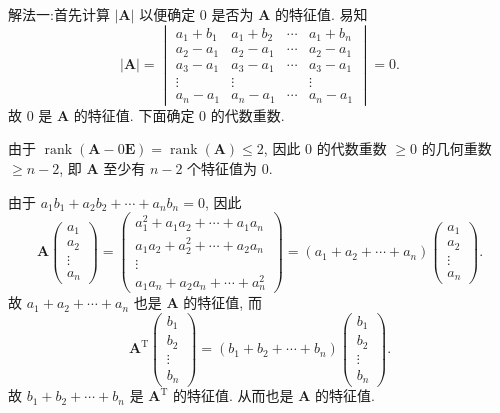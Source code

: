\documentclass[../../main.tex]{subfiles}
\begin{document}
\begin{solution}
{\color{blue}解法一:}首先计算 $|\boldsymbol{A}|$ 以便确定 $0$ 是否为 $\boldsymbol{A}$ 的特征值. 易知
$$
|\boldsymbol{A}| = \begin{vmatrix} a_1 + b_1 & a_1 + b_2 & \cdots & a_1 + b_n \\ a_2 - a_1 & a_2 - a_1 & \cdots & a_2 - a_1 \\ a_3 - a_1 & a_3 - a_1 & \cdots & a_3 - a_1 \\ \vdots & \vdots & & \vdots \\ a_n - a_1 & a_n - a_1 & \cdots & a_n - a_1 \end{vmatrix} = 0.
$$
故 $0$ 是 $\boldsymbol{A}$ 的特征值. 下面确定 $0$ 的代数重数.

由于 $\operatorname{rank}(\boldsymbol{A} - 0\boldsymbol{E}) = \operatorname{rank}(\boldsymbol{A}) \leqslant 2$, 因此 $0$ 的代数重数 $\geqslant 0$ 的几何重数 $\geqslant n - 2$, 即 $\boldsymbol{A}$ 至少有 $n - 2$ 个特征值为 $0$.

由于 $a_1b_1 + a_2b_2 + \cdots + a_nb_n = 0$, 因此
$$
\boldsymbol{A} \begin{pmatrix} a_1 \\ a_2 \\ \vdots \\ a_n \end{pmatrix} = \begin{pmatrix} a_1^2 + a_1a_2 + \cdots + a_1a_n \\ a_1a_2 + a_2^2 + \cdots + a_2a_n \\ \vdots \\ a_1a_n + a_2a_n + \cdots + a_n^2 \end{pmatrix} = (a_1 + a_2 + \cdots + a_n) \begin{pmatrix} a_1 \\ a_2 \\ \vdots \\ a_n \end{pmatrix}.
$$
故 $a_1 + a_2 + \cdots + a_n$ 也是 $\boldsymbol{A}$ 的特征值, 而
$$
\boldsymbol{A}^{\mathrm{T}} \begin{pmatrix} b_1 \\ b_2 \\ \vdots \\ b_n \end{pmatrix} = (b_1 + b_2 + \cdots + b_n) \begin{pmatrix} b_1 \\ b_2 \\ \vdots \\ b_n \end{pmatrix}.
$$
故 $b_1 + b_2 + \cdots + b_n$ 是 $\boldsymbol{A}^{\mathrm{T}}$ 的特征值. 从而也是 $\boldsymbol{A}$ 的特征值.


\end{solution}
\end{document}
